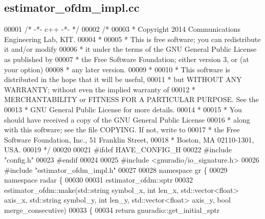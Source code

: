 \subsection{estimator\+\_\+ofdm\+\_\+impl.\+cc}
\label{estimator__ofdm__impl_8cc_source}

\begin{DoxyCode}
00001 \textcolor{comment}{/* -*- c++ -*- */}
00002 \textcolor{comment}{/* }
00003 \textcolor{comment}{ * Copyright 2014 Communications Engineering Lab, KIT.}
00004 \textcolor{comment}{ * }
00005 \textcolor{comment}{ * This is free software; you can redistribute it and/or modify}
00006 \textcolor{comment}{ * it under the terms of the GNU General Public License as published by}
00007 \textcolor{comment}{ * the Free Software Foundation; either version 3, or (at your option)}
00008 \textcolor{comment}{ * any later version.}
00009 \textcolor{comment}{ * }
00010 \textcolor{comment}{ * This software is distributed in the hope that it will be useful,}
00011 \textcolor{comment}{ * but WITHOUT ANY WARRANTY; without even the implied warranty of}
00012 \textcolor{comment}{ * MERCHANTABILITY or FITNESS FOR A PARTICULAR PURPOSE.  See the}
00013 \textcolor{comment}{ * GNU General Public License for more details.}
00014 \textcolor{comment}{ * }
00015 \textcolor{comment}{ * You should have received a copy of the GNU General Public License}
00016 \textcolor{comment}{ * along with this software; see the file COPYING.  If not, write to}
00017 \textcolor{comment}{ * the Free Software Foundation, Inc., 51 Franklin Street,}
00018 \textcolor{comment}{ * Boston, MA 02110-1301, USA.}
00019 \textcolor{comment}{ */}
00020 
00021 \textcolor{preprocessor}{#ifdef HAVE\_CONFIG\_H}
00022 \textcolor{preprocessor}{#include "config.h"}
00023 \textcolor{preprocessor}{#endif}
00024 
00025 \textcolor{preprocessor}{#include <gnuradio/io\_signature.h>}
00026 \textcolor{preprocessor}{#include "estimator_ofdm_impl.h"}
00027 
00028 \textcolor{keyword}{namespace }gr \{
00029   \textcolor{keyword}{namespace }radar \{
00030 
00031     estimator_ofdm::sptr
00032     estimator_ofdm::make(std::string symbol\_x, \textcolor{keywordtype}{int} len\_x, std::vector<float> axis\_x, 
      std::string symbol\_y, \textcolor{keywordtype}{int} len\_y, std::vector<float> axis\_y, \textcolor{keywordtype}{bool} merge\_consecutive)
00033     \{
00034       \textcolor{keywordflow}{return} gnuradio::get\_initial\_sptr

\end{DoxyCode}
